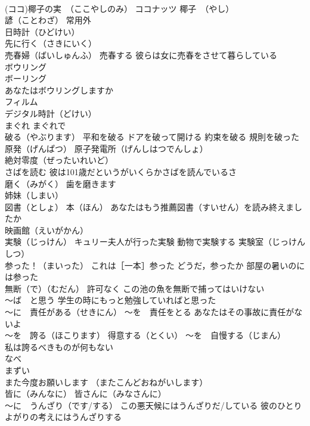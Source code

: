 \documentclass[8pt]{extreport}
\begin{document}
\begin{CJK}{UTF8}{min}
\\	(ココ)椰子の実　（ここやしのみ） ココナッツ 椰子　（やし）
\\	諺（ことわざ） 常用外
\\	日時計（ひどけい）
\\	先に行く（さきにいく）
\\	売春婦（ばいしゅんふ） 売春する 彼らは女に売春をさせて暮らしている
\\	ボウリング 
\\	ボーリング 
\\	あなたはボウリングしますか
\\	フィルム
\\	デジタル時計（どけい）
\\	まぐれ まぐれで
\\	破る（やぶります） 平和を破る ドアを破って開ける 約束を破る 規則を破った
\\	原発（げんぱつ） 原子発電所（げんしはつでんしょ）
\\	絶対零度（ぜったいれいど）
\\	さばを読む 彼は101歳だというがいくらかさばを読んでいるさ
\\	磨く（みがく） 歯を磨きます
\\	姉妹（しまい）
\\	図書（としょ） 本（ほん） あなたはもう推薦図書（すいせん）を読み終えましたか
\\	映画館（えいがかん）
\\	実験（じっけん） キュリー夫人が行った実験 動物で実験する 実験室（じっけんしつ）
\\	参った！（まいった） これは［一本］参った どうだ，参ったか 部屋の暑いのには参った
\\	無断（で）（むだん） 許可なく この池の魚を無断で捕ってはいけない
\\	～ば　と思う 学生の時にもっと勉強していればと思った
\\	～に　責任がある（せきにん） ～を　責任をとる あなたはその事故に責任がないよ
\\	～を　誇る（ほこります） 得意する（とくい） ～を　自慢する（じまん） 
\\	私は誇るべきものが何もない
\\	なべ
\\	まずい
\\	また今度お願いします （またこんどおねがいします）
\\	皆に（みんなに） 皆さんに（みなさんに）
\\	～に　うんざり（です/する） この悪天候にはうんざりだ/している 彼のひとりよがりの考えにはうんざりする

\end{CJK}
\end{document}
